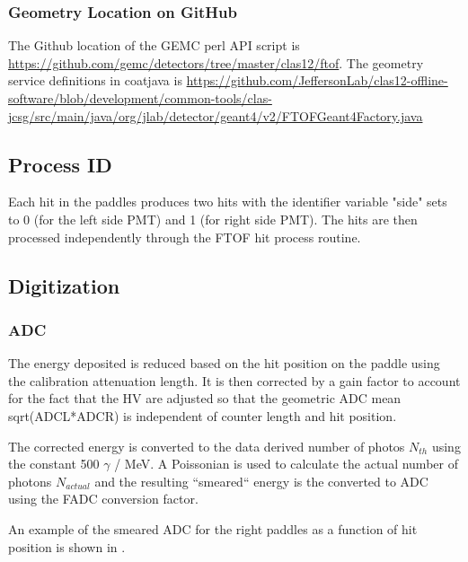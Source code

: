 \subsubsection{Geometry Location on GitHub}
The Github location of the GEMC perl API script is \url{https://github.com/gemc/detectors/tree/master/clas12/ftof}.
The geometry service definitions in coatjava is \url{https://github.com/JeffersonLab/clas12-offline-software/blob/development/common-tools/clas-jcsg/src/main/java/org/jlab/detector/geant4/v2/FTOFGeant4Factory.java}

\subsection{Process ID}

Each hit in the paddles produces two hits with the identifier variable "side" sets to 0 (for the left side PMT) and 1 (for right side PMT).
The hits are then processed independently through the FTOF hit process routine.

\subsection{Digitization}

\subsubsection{ADC}
The energy deposited is reduced based on the hit position on the paddle using the calibration attenuation length. It is then corrected by a gain factor
to account for the fact that the HV are adjusted so that the geometric ADC mean sqrt(ADCL*ADCR) is independent of counter length and hit position.

The corrected energy is converted to the data derived number of photos $N_{th}$ using the constant 500 $\gamma$ / MeV. A Poissonian is used to
calculate the actual number of photons $N_{actual}$ and the resulting ``smeared`` energy is the converted to ADC using the FADC conversion factor.

An example of the smeared ADC for the right paddles as a function of hit position is shown in .

